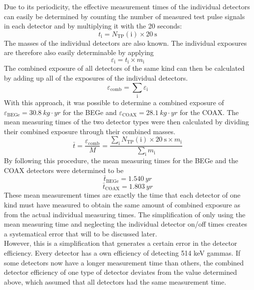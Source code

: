 \documentclass[encoding=utf8,british]{tumphthesis}
\begin{document}
Due to its periodicity, the effective measurement times of the individual detectors can easily be determined by counting the number of measured test pulse signals in each detector and by multiplying it with the 20 seconds:
\begin{equation}
    t_\mathrm{i} = N_{\mathrm{TP}}(\mathrm{i}) \times 20 \  \mathrm{s}
\end{equation}
The masses of the individual detectors are also known.
The individual exposures are therefore also easily determinable by applying 
\begin{equation}
    \varepsilon_\mathrm{i} = t_\mathrm{i} \times m_\mathrm{i}
\end{equation}
The combined exposure of all detectors of the same kind can then be calculated by adding up all of the exposures of the individual detectors.  
\begin{equation}
    \varepsilon_{\mathrm{comb}} = \sum_\mathrm{i} \varepsilon_\mathrm{i}
\end{equation}
With this approach, it was possible to determine a combined exposure of $\varepsilon_{\mathrm{BEGe}} = 30.8 \ \unit{kg}\cdot \unit{yr}$ for the BEGe and $\varepsilon_{\mathrm{COAX}} = 28.1 \ \unit{kg}\cdot \unit{yr}  $ for the COAX.
The mean measuring times of the two detector types were then calculated by dividing their combined exposure through their combined masses. 
\begin{equation}
    \bar{t} = \frac{\varepsilon_{\mathrm{comb}}}{M} = \frac{\sum_\mathrm{i} N_{\mathrm{TP}}(\mathrm{i}) \times 20 \ \mathrm{s} \times m_\mathrm{i}}{\sum_\mathrm{i} m_\mathrm{i}}
\end{equation}
By following this procedure, the mean measuring times for the BEGe and the COAX detectors were determined to be
\begin{equation*}
   \bar{t}_{\mathrm{BEGe}} = 1.540 \ \unit{yr}  
\end{equation*}
\begin{equation*}
    \bar{t}_{\mathrm{COAX}} = 1.803 \ \unit{yr} 
\end{equation*}
These mean measurement times are exactly the time that each detector of one kind must have measured to obtain the same amount of combined exposure as from the actual individual measuring times.
The simplification of only using the mean measuring time and neglecting the individual detector on/off times creates a systematical error that will to be discussed later.
\\


\iffalse
However, this is a simplification that generates a certain error in the detector efficiency.
Every detector has a own efficiency of detecting 514 keV gammas.
If some detectors now have a longer measurement time than others, the combined detector efficiency of one type of detector deviates from the value determined above, which assumed that all detectors had the same measurement time.
\end{document}
